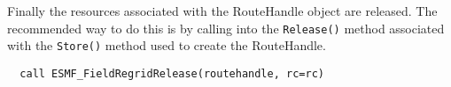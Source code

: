 
   Finally the resources associated with the RouteHandle object are released.
   The recommended way to do this is by calling into the {\tt Release()} method
   associated with the {\tt Store()} method used to create the RouteHandle. 

 \begin{verbatim}
  call ESMF_FieldRegridRelease(routehandle, rc=rc)
 
\end{verbatim}

\setlength{\parskip}{\oldparskip}
\setlength{\parindent}{\oldparindent}
\setlength{\baselineskip}{\oldbaselineskip}

